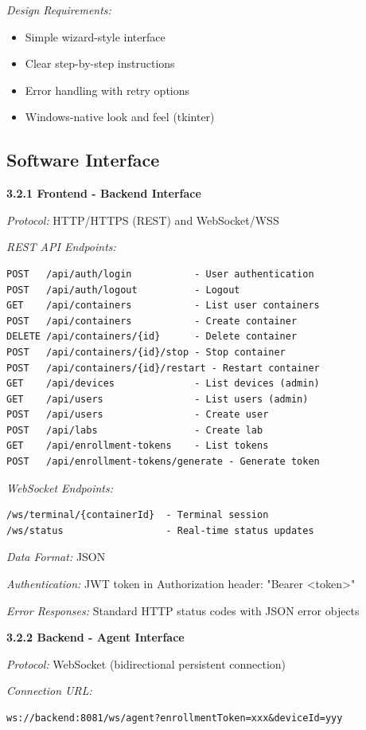 \documentclass[12pt,a4paper]{article}
\begin{document}
\textit{Design Requirements:}
\begin{itemize}[noitemsep]
    \item Simple wizard-style interface
    \item Clear step-by-step instructions
    \item Error handling with retry options
    \item Windows-native look and feel (tkinter)
\end{itemize}

\subsection{Software Interface}

\textbf{3.2.1 Frontend - Backend Interface}

\textit{Protocol:} HTTP/HTTPS (REST) and WebSocket/WSS

\textit{REST API Endpoints:}
\begin{verbatim}
POST   /api/auth/login           - User authentication
POST   /api/auth/logout          - Logout
GET    /api/containers           - List user containers
POST   /api/containers           - Create container
DELETE /api/containers/{id}      - Delete container
POST   /api/containers/{id}/stop - Stop container
POST   /api/containers/{id}/restart - Restart container
GET    /api/devices              - List devices (admin)
GET    /api/users                - List users (admin)
POST   /api/users                - Create user
POST   /api/labs                 - Create lab
GET    /api/enrollment-tokens    - List tokens
POST   /api/enrollment-tokens/generate - Generate token
\end{verbatim}

\textit{WebSocket Endpoints:}
\begin{verbatim}
/ws/terminal/{containerId}  - Terminal session
/ws/status                  - Real-time status updates
\end{verbatim}

\textit{Data Format:} JSON

\textit{Authentication:} JWT token in Authorization header: "Bearer <token>"

\textit{Error Responses:} Standard HTTP status codes with JSON error objects

\textbf{3.2.2 Backend - Agent Interface}

\textit{Protocol:} WebSocket (bidirectional persistent connection)

\textit{Connection URL:}
\begin{verbatim}
ws://backend:8081/ws/agent?enrollmentToken=xxx&deviceId=yyy
\end{verbatim}
\end{document}
